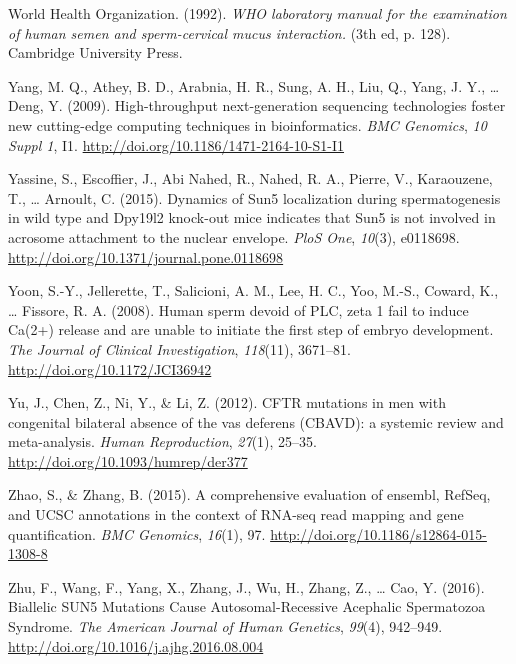 \documentclass[12pt,twoside]{reedthesis}
\theoremstyle{definition}
\theoremstyle{definition}
\theoremstyle{remark}
\begin{document}
  \hypertarget{ref-WorldHealthOrganization1992}{}
  World Health Organization. (1992). \emph{WHO laboratory manual for the
  examination of human semen and sperm-cervical mucus interaction.} (3th
  ed, p. 128). Cambridge University Press.
  
  \hypertarget{ref-Yang2009}{}
  Yang, M. Q., Athey, B. D., Arabnia, H. R., Sung, A. H., Liu, Q., Yang,
  J. Y., \ldots{} Deng, Y. (2009). High-throughput next-generation
  sequencing technologies foster new cutting-edge computing techniques in
  bioinformatics. \emph{BMC Genomics}, \emph{10 Suppl 1}, I1.
  \url{http://doi.org/10.1186/1471-2164-10-S1-I1}
  
  \hypertarget{ref-Yassine2015}{}
  Yassine, S., Escoffier, J., Abi Nahed, R., Nahed, R. A., Pierre, V.,
  Karaouzene, T., \ldots{} Arnoult, C. (2015). Dynamics of Sun5
  localization during spermatogenesis in wild type and Dpy19l2 knock-out
  mice indicates that Sun5 is not involved in acrosome attachment to the
  nuclear envelope. \emph{PloS One}, \emph{10}(3), e0118698.
  \url{http://doi.org/10.1371/journal.pone.0118698}
  
  \hypertarget{ref-Yoon2008}{}
  Yoon, S.-Y., Jellerette, T., Salicioni, A. M., Lee, H. C., Yoo, M.-S.,
  Coward, K., \ldots{} Fissore, R. A. (2008). Human sperm devoid of PLC,
  zeta 1 fail to induce Ca(2+) release and are unable to initiate the
  first step of embryo development. \emph{The Journal of Clinical
  Investigation}, \emph{118}(11), 3671--81.
  \url{http://doi.org/10.1172/JCI36942}
  
  \hypertarget{ref-Yu2012}{}
  Yu, J., Chen, Z., Ni, Y., \& Li, Z. (2012). CFTR mutations in men with
  congenital bilateral absence of the vas deferens (CBAVD): a systemic
  review and meta-analysis. \emph{Human Reproduction}, \emph{27}(1),
  25--35. \url{http://doi.org/10.1093/humrep/der377}
  
  \hypertarget{ref-Zhao2015}{}
  Zhao, S., \& Zhang, B. (2015). A comprehensive evaluation of ensembl,
  RefSeq, and UCSC annotations in the context of RNA-seq read mapping and
  gene quantification. \emph{BMC Genomics}, \emph{16}(1), 97.
  \url{http://doi.org/10.1186/s12864-015-1308-8}
  
  \hypertarget{ref-Zhu2016}{}
  Zhu, F., Wang, F., Yang, X., Zhang, J., Wu, H., Zhang, Z., \ldots{} Cao,
  Y. (2016). Biallelic SUN5 Mutations Cause Autosomal-Recessive Acephalic
  Spermatozoa Syndrome. \emph{The American Journal of Human Genetics},
  \emph{99}(4), 942--949. \url{http://doi.org/10.1016/j.ajhg.2016.08.004}


\end{document}
